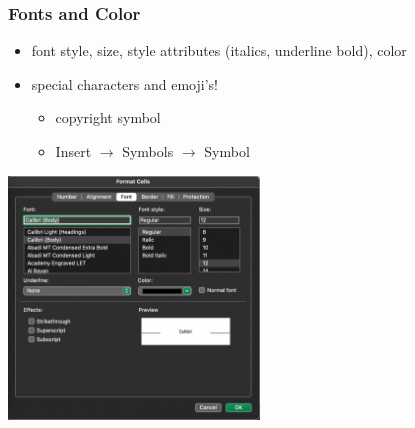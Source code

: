 \documentclass[12pt]{beamer}
\begin{document}
	\begin{frame}
		\frametitle{Fonts and Color}
		\begin{itemize}
			\item font style, size, style attributes (italics, underline bold), color
			\item special characters and emoji's! 
				\begin{itemize}
					\item  copyright symbol \textcopyright
					\item Insert $\rightarrow$ Symbols  $\rightarrow$ Symbol
				\end{itemize}
		\end{itemize}
		\begin{center}
			\includegraphics[width=0.5\textwidth]{cellformat_font_tab.png}
		\end{center}
	\end{frame}
\end{document}
